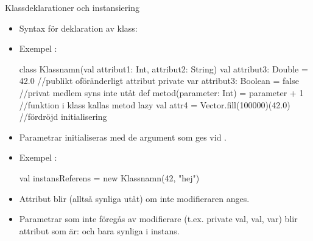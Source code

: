 \begin{Slide}{Klassdeklarationer och instansiering}\SlideFontSmall
\setlength{\leftmargini}{0pt}
\begin{itemize}
\item Syntax för deklaration av klass: \\ \vspace{0.5em}



\item Exempel :
\begin{Code}
class Klassnamn(val attribut1: Int, attribut2: String){  
  val attribut3: Double = 42.0              //publikt oföränderligt attribut
  private var attribut3: Boolean = false    //privat medlem syns inte utåt
  def metod(parameter: Int) = parameter + 1 //funktion i klass kallas metod
  lazy val attr4 = Vector.fill(100000)(42.0)     //fördröjd initialisering 
}
\end{Code}

\item Parametrar initialiseras med de argument som ges vid . 
\item Exempel :
\begin{Code}
val instansReferens = new Klassnamn(42, "hej")
\end{Code}

\item Attribut blir  (alltså synliga utåt) om inte modifieraren  anges.
\item Parametrar som inte föregås av modifierare (t.ex. private val, val, var) blir attribut som är:  och bara synliga i  instans.

\end{itemize}
\end{Slide}


